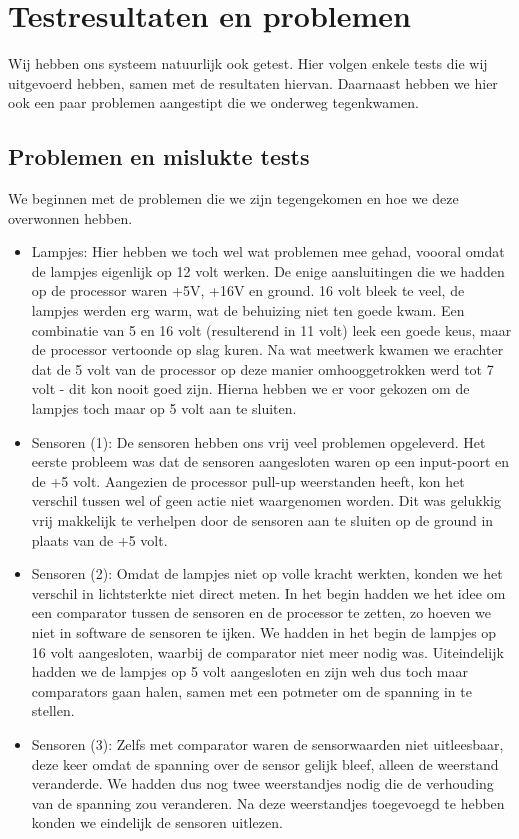 \section{Testresultaten en problemen}
Wij hebben ons systeem natuurlijk ook getest. Hier volgen enkele tests die wij uitgevoerd hebben, samen met de resultaten hiervan. Daarnaast hebben we hier ook een paar problemen aangestipt die we onderweg tegenkwamen.

\subsection{Problemen en mislukte tests}
We beginnen met de problemen die we zijn tegengekomen en hoe we deze overwonnen hebben.

\begin{itemize}
    \item Lampjes: Hier hebben we toch wel wat problemen mee gehad, voooral omdat de lampjes eigenlijk op 12 volt werken. De enige aansluitingen die we hadden op de processor waren +5V, +16V en ground. 16 volt bleek te veel, de lampjes werden erg warm, wat de behuizing niet ten goede kwam. Een combinatie van 5 en 16 volt (resulterend in 11 volt) leek een goede keus, maar de processor vertoonde op slag kuren. Na wat meetwerk kwamen we erachter dat de 5 volt van de processor op deze manier omhooggetrokken werd tot 7 volt - dit kon nooit goed zijn. Hierna hebben we er voor gekozen om de lampjes toch maar op 5 volt aan te sluiten.
    \item Sensoren (1): De sensoren hebben ons vrij veel problemen opgeleverd. Het eerste probleem was dat de sensoren aangesloten waren op een input-poort en de +5 volt. Aangezien de processor pull-up weerstanden heeft, kon het verschil tussen wel of geen actie niet waargenomen worden. Dit was gelukkig vrij makkelijk te verhelpen door de sensoren aan te sluiten op de ground in plaats van de +5 volt.
    \item Sensoren (2): Omdat de lampjes niet op volle kracht werkten, konden we het verschil in lichtsterkte niet direct meten. In het begin hadden we het idee om een comparator tussen de sensoren en de processor te zetten, zo hoeven we niet in software de sensoren te ijken. We hadden in het begin de lampjes op 16 volt aangesloten, waarbij de comparator niet meer nodig was. Uiteindelijk hadden we de lampjes op 5 volt aangesloten en zijn weh dus toch maar comparators gaan halen, samen met een potmeter om de spanning in te stellen.
    \item Sensoren (3): Zelfs met comparator waren de sensorwaarden niet uitleesbaar, deze keer omdat de spanning over de sensor gelijk bleef, alleen de weerstand veranderde. We hadden dus nog twee weerstandjes nodig die de verhouding van de spanning zou veranderen. Na deze weerstandjes toegevoegd te hebben konden we eindelijk de sensoren uitlezen.

\end{itemize}
